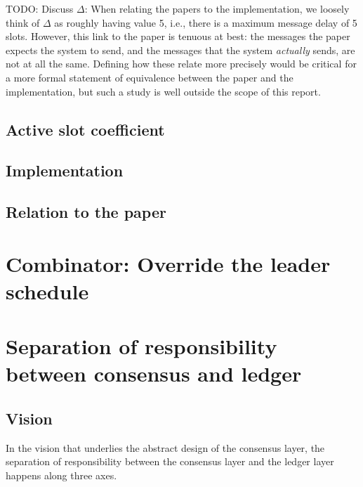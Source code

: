 TODO: Discuss $\Delta$: When relating the papers to the implementation, we
loosely think of $\Delta$ as roughly having value 5, i.e., there is a maximum
message delay of 5 slots. However, this link to the paper is tenuous at best:
the messages the paper expects the system to send, and the messages that the
system \emph{actually} sends, are not at all the same. Defining how these relate
more precisely would be critical for a more formal statement of equivalence
between the paper and the implementation, but such a study is well outside the
scope of this report.

\subsection{Active slot coefficient}
\label{praos:f}

\subsection{Implementation}

\subsection{Relation to the paper}
\label{praos-paper}

\cite{cryptoeprint:2018:378}

\section{Combinator: Override the leader schedule}
\label{consensus:override-leader-schedule}

\cleardoublepage
\section{Separation of responsibility between consensus and ledger}

\subsection{Vision}

In the vision that underlies the abstract design of the consensus layer,
the separation of responsibility between the consensus layer and the
ledger layer happens along three axes.

